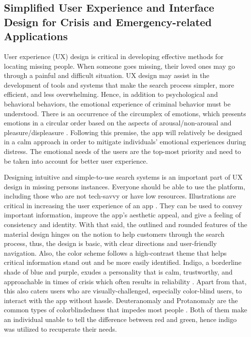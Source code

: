 \subsection{Simplified User Experience and Interface Design for Crisis and Emergency-related Applications}

User experience (UX) design is critical in developing effective methods for locating missing people. When someone goes missing, their loved ones may go through a painful and difficult situation. UX design may assist in the development of tools and systems that make the search process simpler, more efficient, and less overwhelming. Hence, in addition to psychological and behavioral behaviors, the emotional experience of criminal behavior must be understood. There is an occurrence of the circumplex of emotions, which presents emotions in a circular order based on the aspects of arousal/non-arousal and pleasure/displeasure \cite{hunt_2020, suchana_2021}. Following this premise, the app will relatively be designed in a calm approach in order to mitigate individuals' emotional experiences during distress. The emotional needs of the users are the top-most priority and need to be taken into account for better user experience. 
 
Designing intuitive and simple-to-use search systems is an important part of UX design in missing persons instances. Everyone should be able to use the platform, including those who are not tech-savvy or have low resources. Illustrations are critical in increasing the user experience of an app \cite{suchana_2021}. They can be used to convey important information, improve the app's aesthetic appeal, and give a feeling of consistency and identity. With that said, the outlined and rounded features of the material design hinges on the notion to help customers through the search process, thus, the design is basic, with clear directions and user-friendly navigation. Also, the color scheme follows a high-contrast theme that helps critical information stand out and be more easily identified. Indigo, a borderline shade of blue and purple, exudes a personality that is calm, trustworthy, and approachable in times of crisis which often results in reliability \cite{babich_2017}. Apart from that, this also caters users who are visually-challenged, especially color-blind users, to interact with the app without hassle. Deuteranomaly and Protanomaly are the common types of colorblindedness that impedes most people \cite{babich_2017, NEI_2019}. Both of them make an individual unable to tell the difference between red and green, hence indigo was utilized to recuperate their needs. 
 
